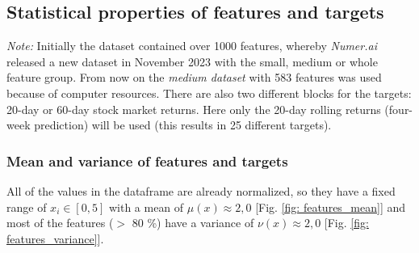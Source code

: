 \documentclass[12pt, a4paper]{article}
\begin{document}
\subsection{Statistical properties of features and targets}
\textit{Note:} Initially the dataset contained over 1000 features, whereby \textit{Numer.ai} released a new dataset in November 2023 with the small, medium or whole feature group. From now on the \textit{medium dataset} with 583 features was used because of computer resources.
There are also two different blocks for the targets: 20-day or 60-day stock market returns. Here only the 20-day rolling returns (four-week prediction) will be used (this results in 25 different targets).
\subsubsection{Mean and variance of features and targets}
All of the values in the dataframe are already normalized, so they have a fixed range of $x_i \in [0,5]$ with a mean of $\mu(x) \approx 2{,}0$ [Fig. \ref{fig: features_mean}] and most of the features ($>$ 80 \%) have a variance of $\nu(x) \approx 2{,}0$ [Fig. \ref{fig: features_variance}].
\end{document}
